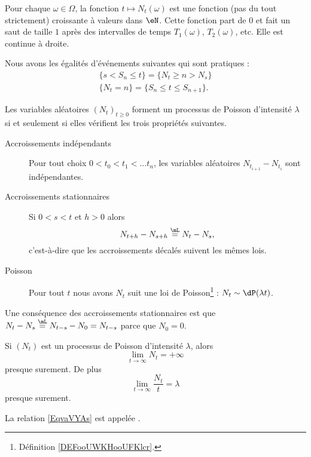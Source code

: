 Pour chaque \( \omega\in \Omega\), la fonction \( t\mapsto N_t(\omega)\) est une fonction (pas du tout strictement) croissante à valeurs dans \( \eN\). Cette fonction part de \( 0\) et fait un saut de taille \( 1\) après des intervalles de temps \( T_1(\omega)\), \( T_2(\omega)\), etc. Elle est continue à droite.

Nous avons les égalités d'événements suivantes qui sont pratiques :
\begin{subequations}
	\begin{align}
		\{ s<S_n\leq t \}=\{ N_t\geq n>N_s \} \\
		\{ N_t=n \}=\{ S_n\leq t\leq S_{n+1} \}.
	\end{align}
\end{subequations}

\begin{theorem}     \label{THOooVDMCooVycibj}
	Les variables aléatoires \( (N_t)_{t\geq 0}\) forment un processus de Poisson d'intensité \( \lambda\) si et seulement si elles vérifient les trois propriétés suivantes.
	\begin{description}
		\item[Accroissements indépendants] Pour tout choix \( 0<t_0<t_1<\ldots t_n\), les variables aléatoires \( N_{t_{i+1}}-N_{t_i}\) sont indépendantes.
		\item[Accroissements stationnaires] Si \( 0<s<t\) et \( h>0\) alors
		      \begin{equation}
			      N_{t+h}-N_{s+h}\stackrel{\mL}{=}N_t-N_s,
		      \end{equation}
		      c'est-à-dire que les accroissements décalés suivent les mêmes lois.
          \item[Poisson] Pour tout \( t\) nous avons \( N_t\) suit une loi de Poisson\footnote{Définition \ref{DEFooUWKHooUFKlcr}.} : \( N_t\sim\dP(\lambda t)\).
	\end{description}
\end{theorem}
Une conséquence des accroissements stationnaires est que \( N_t-N_s\stackrel{\mL}{=}N_{t-s}-N_0=N_{t-s}\) parce que \( N_0=0\).

\begin{proposition}
	Si \( (N_t)\) est un processus de Poisson d'intensité \( \lambda\), alors
	\begin{equation}
		\lim_{t\to \infty} N_t=+\infty
	\end{equation}
	presque surement. De plus
	\begin{equation}        \label{EqvaVYAs}
		\lim_{t\to \infty} \frac{ N_t }{ t }=\lambda
	\end{equation}
	presque surement.
\end{proposition}
La relation \eqref{EqvaVYAs} est appelée .

